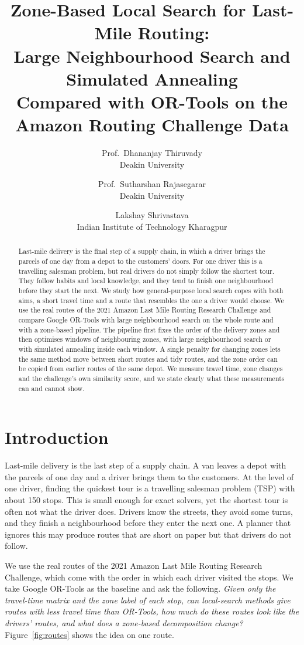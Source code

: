 \documentclass[11pt,a4paper]{article}
\title{Zone-Based Local Search for Last-Mile Routing:\\
Large Neighbourhood Search and Simulated Annealing\\
Compared with OR-Tools on the Amazon Routing Challenge Data}
\author{Prof.\ Dhananjay Thiruvady\\Deakin University
\and Prof.\ Sutharshan Rajasegarar\\Deakin University
\and Lakshay Shrivastava\\Indian Institute of Technology Kharagpur}
\date{}
\begin{document}
\maketitle

\begin{abstract}
Last-mile delivery is the final step of a supply chain, in which a driver brings the parcels of one day from a depot to the customers' doors. For one driver this is a travelling salesman problem, but real drivers do not simply follow the shortest tour. They follow habits and local knowledge, and they tend to finish one neighbourhood before they start the next. We study how general-purpose local search copes with both aims, a short travel time and a route that resembles the one a driver would choose. We use the real routes of the 2021 Amazon Last Mile Routing Research Challenge and compare Google OR-Tools with large neighbourhood search on the whole route and with a zone-based pipeline. The pipeline first fixes the order of the delivery zones and then optimises windows of neighbouring zones, with large neighbourhood search or with simulated annealing inside each window. A single penalty for changing zones lets the same method move between short routes and tidy routes, and the zone order can be copied from earlier routes of the same depot. We measure travel time, zone changes and the challenge's own similarity score, and we state clearly what these measurements can and cannot show.
\end{abstract}

\section{Introduction}
Last-mile delivery is the last step of a supply chain. A van leaves a depot with the parcels of one day and a driver brings them to the customers. At the level of one driver, finding the quickest tour is a travelling salesman problem (TSP) with about 150 stops. This is small enough for exact solvers, yet the shortest tour is often not what the driver does. Drivers know the streets, they avoid some turns, and they finish a neighbourhood before they enter the next one. A planner that ignores this may produce routes that are short on paper but that drivers do not follow.

We use the real routes of the 2021 Amazon Last Mile Routing Research Challenge, which come with the order in which each driver visited the stops. We take Google OR-Tools as the baseline and ask the following. \emph{Given only the travel-time matrix and the zone label of each stop, can local-search methods give routes with less travel time than OR-Tools, how much do these routes look like the drivers' routes, and what does a zone-based decomposition change?} Figure~\ref{fig:routes} shows the idea on one route.
\end{document}
